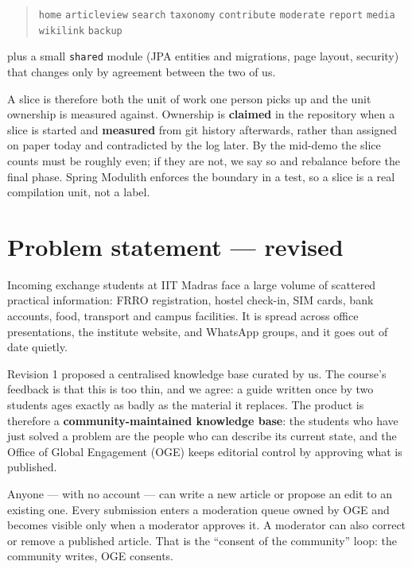 \documentclass[11pt]{article}
\begin{document}
\begin{quote}
\texttt{home} \enspace \texttt{articleview} \enspace \texttt{search} \enspace \texttt{taxonomy}
\enspace \texttt{contribute} \enspace \texttt{moderate} \enspace \texttt{report} \enspace
\texttt{media} \enspace \texttt{wikilink} \enspace \texttt{backup}
\end{quote}

\noindent plus a small \texttt{shared} module (JPA entities and migrations, page layout, security)
that changes only by agreement between the two of us.

A slice is therefore both the unit of work one person picks up and the unit ownership is measured
against. Ownership is \textbf{claimed} in the repository when a slice is started and
\textbf{measured} from git history afterwards, rather than assigned on paper today and contradicted
by the log later. By the mid-demo the slice counts must be roughly even; if they are not, we say so
and rebalance before the final phase. Spring Modulith enforces the boundary in a test, so a slice is
a real compilation unit, not a label.

\section{Problem statement --- revised}

Incoming exchange students at IIT Madras face a large volume of scattered practical information:
FRRO registration, hostel check-in, SIM cards, bank accounts, food, transport and campus facilities.
It is spread across office presentations, the institute website, and WhatsApp groups, and it goes
out of date quietly.

Revision 1 proposed a centralised knowledge base curated by us. The course's feedback is that this
is too thin, and we agree: a guide written once by two students ages exactly as badly as the
material it replaces. The product is therefore a \textbf{community-maintained knowledge base}: the
students who have just solved a problem are the people who can describe its current state, and the
Office of Global Engagement (OGE) keeps editorial control by approving what is published.

Anyone --- with no account --- can write a new article or propose an edit to an existing one. Every
submission enters a moderation queue owned by OGE and becomes visible only when a moderator approves
it. A moderator can also correct or remove a published article. That is the ``consent of the
community'' loop: the community writes, OGE consents.
\end{document}
